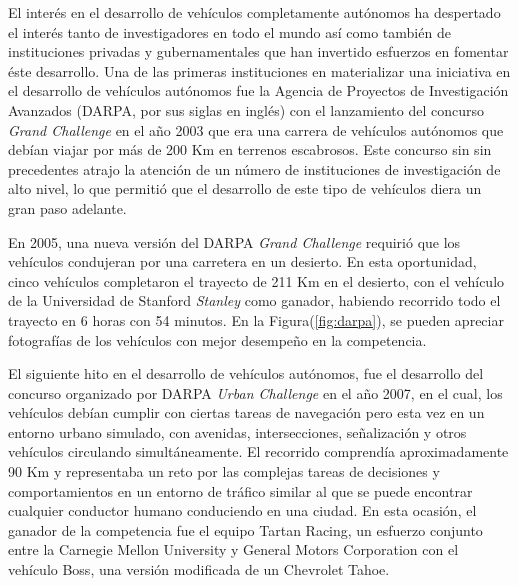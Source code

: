 El interés en el desarrollo de vehículos completamente autónomos ha despertado el interés tanto de investigadores en todo 
el mundo así como también de instituciones privadas y gubernamentales que han invertido esfuerzos en fomentar éste desarrollo.
Una de las primeras instituciones en materializar una iniciativa en el desarrollo de vehículos autónomos fue la Agencia de Proyectos 
de Investigación Avanzados (DARPA, por sus siglas en inglés) con el lanzamiento del concurso \textit{Grand Challenge} en el 
año 2003 que era una carrera de vehículos autónomos que debían viajar por más de 200 Km en terrenos escabrosos. Este concurso sin 
sin precedentes atrajo la atención de un número de instituciones de investigación de alto nivel, lo que permitió que el desarrollo 
de este tipo de vehículos diera un gran paso adelante. 

En 2005, una nueva versión del DARPA \textit{Grand Challenge} requirió que los vehículos condujeran por una carretera en un 
desierto. En esta oportunidad, cinco vehículos completaron el trayecto de 211 Km en el desierto, con el vehículo de la Universidad 
de Stanford \textit{Stanley} como ganador, habiendo recorrido todo el trayecto en 6 horas con 54 minutos. En la Figura(\ref{fig:darpa}),
se pueden apreciar fotografías de los vehículos con mejor desempeño en la competencia.

El siguiente hito en el desarrollo de vehículos autónomos, fue el desarrollo del concurso organizado por DARPA 
\textit{Urban Challenge} en el año 2007, en el cual, los vehículos debían cumplir con ciertas tareas de 
navegación pero esta vez en un entorno urbano simulado, con avenidas, intersecciones, señalización y 
otros vehículos circulando simultáneamente. El recorrido comprendía aproximadamente 90 Km y representaba un reto por las 
complejas tareas de decisiones y comportamientos en un entorno de tráfico similar al que se puede encontrar cualquier conductor 
humano conduciendo en una ciudad. En esta ocasión, el ganador de la competencia fue el equipo Tartan Racing, un esfuerzo conjunto entre 
la Carnegie Mellon University y General Motors Corporation con el vehículo Boss, una versión modificada de un Chevrolet Tahoe.



